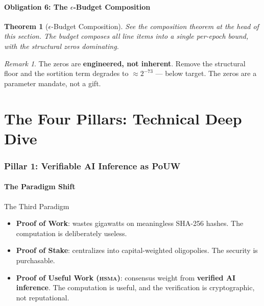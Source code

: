 \documentclass[11pt, a4paper]{article}
\theoremstyle{plain}
\newtheorem{theorem}{Theorem}
\theoremstyle{definition}
\theoremstyle{remark}
\newtheorem{remark}{Remark}
\newcommand{\hsma}{\textsc{hsma}}
\begin{document}
\subsection{Obligation 6: The $\epsilon$-Budget Composition}

\begin{theorem}[$\epsilon$-Budget Composition]
See the composition theorem at the head of this section. The budget
composes all line items into a single per-epoch bound, with the
structural zeros dominating.
\end{theorem}

\begin{remark}
The zeros are \textbf{engineered, not inherent}. Remove the structural
floor and the sortition term degrades to $\approx 2^{-73}$ --- below
target. The zeros are a parameter mandate, not a gift.
\end{remark}

\part{The Four Pillars: Technical Deep Dive}

\section{Pillar 1: Verifiable AI Inference as PoUW}
\label{sec:pouw}

\subsection{The Paradigm Shift}

\begin{defnbox}{The Third Paradigm}
\begin{itemize}
\item \textbf{Proof of Work}: wastes gigawatts on meaningless SHA-256
hashes. The computation is deliberately useless.
\item \textbf{Proof of Stake}: centralizes into capital-weighted
oligopolies. The security is purchasable.
\item \textbf{Proof of Useful Work (\hsma{})}: consensus weight from
\textbf{verified AI inference}. The computation is useful, and the
verification is cryptographic, not reputational.
\end{itemize}
\end{defnbox}
\end{document}

